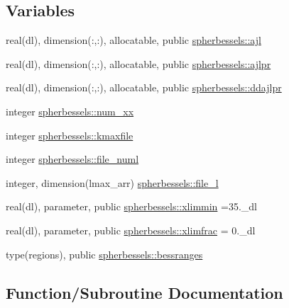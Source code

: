 \subsection*{Variables}
\begin{DoxyCompactItemize}
\item 
real(dl), dimension(\+:,\+:), allocatable, public \mbox{\hyperlink{namespacespherbessels_ad90cf19f2544f8107ae70ec1b4cd64e0}{spherbessels\+::ajl}}
\item 
real(dl), dimension(\+:,\+:), allocatable, public \mbox{\hyperlink{namespacespherbessels_aafb6422b5aab90f84fdb3a955c129874}{spherbessels\+::ajlpr}}
\item 
real(dl), dimension(\+:,\+:), allocatable, public \mbox{\hyperlink{namespacespherbessels_a90a7acde21383c40c841e0a11e87526f}{spherbessels\+::ddajlpr}}
\item 
integer \mbox{\hyperlink{namespacespherbessels_af8cc74b859928826e087b37b4c365afa}{spherbessels\+::num\+\_\+xx}}
\item 
integer \mbox{\hyperlink{namespacespherbessels_acaac392a6ea328fe36eff8c422ff06ea}{spherbessels\+::kmaxfile}}
\item 
integer \mbox{\hyperlink{namespacespherbessels_ab9b99f417336f962381e26fc7611affa}{spherbessels\+::file\+\_\+numl}}
\item 
integer, dimension(lmax\+\_\+arr) \mbox{\hyperlink{namespacespherbessels_abe559ecdb38e3d5173cbf2c709b7a694}{spherbessels\+::file\+\_\+l}}
\item 
real(dl), parameter, public \mbox{\hyperlink{namespacespherbessels_a7609b1d2bbb03aefd6c6f47a69538eed}{spherbessels\+::xlimmin}} =35.\+\_\+dl
\item 
real(dl), parameter, public \mbox{\hyperlink{namespacespherbessels_a07d278e5f2a51b79893a106358cb1afc}{spherbessels\+::xlimfrac}} = 0.\+\_\+dl
\item 
type(regions), public \mbox{\hyperlink{namespacespherbessels_a3ae9c132f8c8a13f8d061492485272b8}{spherbessels\+::bessranges}}
\end{DoxyCompactItemize}


\subsection{Function/\+Subroutine Documentation}
\mbox{\label{bessels_8f90_ac428f01b558b9ca2410cf327ca24ee7f}} 
